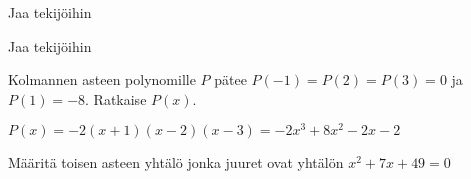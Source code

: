 \begin{tehtavasivu}
\begin{tehtava}
Jaa tekijöihin
\begin{alakohdat}
\end{alakohdat}
\begin{vastaus}
\begin{alakohdat}
\end{alakohdat}
\end{vastaus}
\end{tehtava}

\begin{tehtava}
    Jaa tekijöihin
    \begin{alakohdat}
    \end{alakohdat}
    \begin{vastaus}
    	\begin{alakohdat}
        \end{alakohdat}
    \end{vastaus}
\end{tehtava}

\begin{tehtava}
    Kolmannen asteen polynomille $P$ pätee $P(-1)=P(2)=P(3)=0$ ja $P(1)=-8$. Ratkaise $P(x)$.
    \begin{vastaus}
        $P(x)=-2(x+1)(x-2)(x-3)=-2x^3+8x^2-2x-2$
    \end{vastaus}
\end{tehtava}

\begin{tehtava}
   Määritä toisen asteen yhtälö jonka juuret ovat yhtälön $ x^2+7x+49 =0 $ 
 \begin{alakohdat}
    \end{alakohdat}
    \begin{vastaus}
        \begin{alakohdat}
        \end{alakohdat}
    \end{vastaus}
\end{tehtava}

\end{tehtavasivu}


